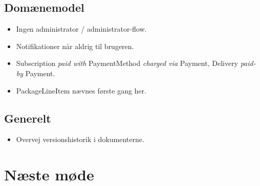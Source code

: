 \documentclass[a4paper,11pt]{article}
\begin{document}
\subsection*{Domænemodel}

\begin{itemize}
    \item Ingen administrator / administrator-flow.
    \item Notifikationer når aldrig til brugeren.
    \item Subscription \emph{paid with} PaymentMethod \emph{charged via} Payment, Delivery \emph{paid-by} Payment.
    \item PackageLineItem nævnes første gang her.
\end{itemize}

\subsection*{Generelt}

\begin{itemize}
    \item Overvej versionshistorik i dokumenterne.
\end{itemize}

\section*{Næste møde}
\end{document}
